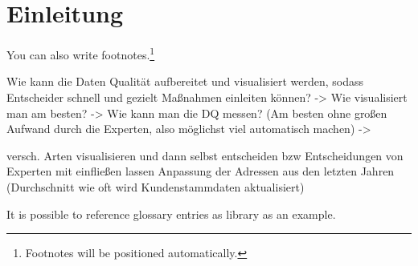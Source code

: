\chapter{Einleitung}\label{ch:intro}

You can also write footnotes.\footnote{Footnotes will be positioned automatically.}

Wie kann die Daten Qualität aufbereitet und visualisiert werden, sodass Entscheider schnell und gezielt Maßnahmen einleiten können?
-> Wie visualisiert man am besten?
-> Wie kann man die DQ messen? (Am besten ohne großen Aufwand durch die Experten, also möglichst viel automatisch machen)
-> 

versch. Arten visualisieren und dann selbst entscheiden bzw Entscheidungen von Experten mit einfließen lassen
Anpassung der Adressen aus den letzten Jahren (Durchschnitt wie oft wird Kundenstammdaten aktualisiert)


It is possible to reference glossary entries as \gls{library} as an example.
